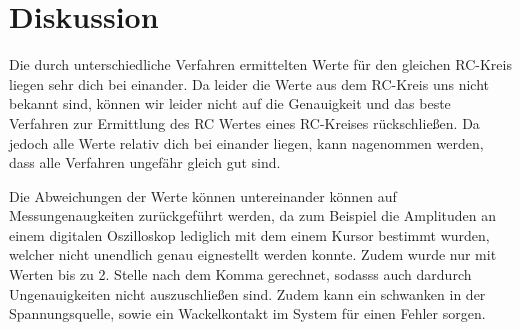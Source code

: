 \section{Diskussion}
\label{sec:Diskussion}
Die durch unterschiedliche Verfahren ermittelten Werte für den gleichen RC-Kreis liegen sehr dich bei einander. Da leider die Werte aus dem RC-Kreis uns nicht bekannt sind, können wir leider
nicht auf die Genauigkeit und das beste Verfahren zur Ermittlung des RC Wertes eines RC-Kreises rückschließen. Da jedoch alle Werte relativ dich bei einander liegen, kann nagenommen werden,
dass alle Verfahren ungefähr gleich gut sind. 

Die Abweichungen der Werte können untereinander können auf Messungenaugkeiten zurückgeführt werden, da zum Beispiel die Amplituden an einem digitalen Oszilloskop lediglich mit dem einem Kursor 
bestimmt wurden, welcher nicht unendlich genau eignestellt werden konnte. Zudem wurde nur mit Werten bis zu 2. Stelle nach dem Komma gerechnet, sodasss auch dardurch Ungenauigkeiten nicht auszuschließen sind.
Zudem kann ein schwanken in der Spannungsquelle, sowie ein Wackelkontakt im System für einen Fehler sorgen.